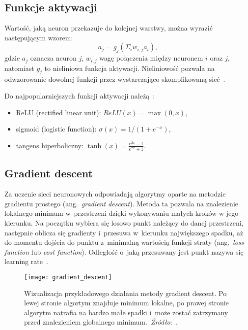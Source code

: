 \subsection{Funkcje aktywacji}\label{subsec:funkcje-aktywacji}

Wartość, jaką neuron przekazuje do kolejnej warstwy, można wyrazić następującym wzorem:
\[a_{j} = g_{j}(\Sigma_{i}w_{i,j}a_{i}),\]
gdzie \(a_{j}\) oznacza neuron \(j\), \(w_{i,j}\) wagę połączenia między neuronem \(i\) oraz \(j\), natomiast \(g_{j}\) to nieliniowa funkcja aktywacji.
Nieliniowość pozwala na odwzorowanie dowolnej funkcji przez wystarczająco skomplikowaną sieć~\cite{Russell2020}.

Do najpopularniejszych funkcji aktywacji należą~\cite{Russell2020}:

\begin{itemize}
    \item ReLU (rectified linear unit): \(ReLU(x) = \max(0, x)\),
    \item sigmoid (logistic function): \(\sigma(x) = 1 / (1 + e^{-x})\),
    \item tangens hiperboliczny: \(\tanh(x) = \frac{e^{2x} - 1} {e^{2x} + 1}\).
\end{itemize}

\subsection{Gradient descent}\label{subsec:gradient-descent}

Za uczenie sieci neuronowych odpowiadają algorytmy oparte na metodzie gradientu prostego (ang.~\textit{gradient descent}).
Metoda ta pozwala na znalezienie lokalnego minimum w~przestrzeni dzięki wykonywaniu małych kroków w jego kierunku.
Na początku wybiera się losowo punkt należący do danej przestrzeni, następnie oblicza się gradienty i~przesuwa w~kierunku największego spadku, aż do momentu dojścia do punktu z~minimalną wartością funkcji straty (ang.~\textit{loss function} lub \textit{cost function}). Odległość o~jaką przesuwany jest punkt nazywa się learning rate~\cite{Russell2020}.

\begin{figure}[h]
    \centering
    \texttt{[image: gradient\_descent]}
    \caption{Wizualizacja przykładowego działania metody gradient descent. Po lewej stronie algortym znajduje minimum lokalne, po prawej stronie algorytm natrafia na bardzo małe spadki i~może zostać zatrzymany przed znalezieniem globalnego minimum.~\textit{Źródło:~\cite{Geron2019}}.}
    \label{fig:gradient-descent}
\end{figure}

